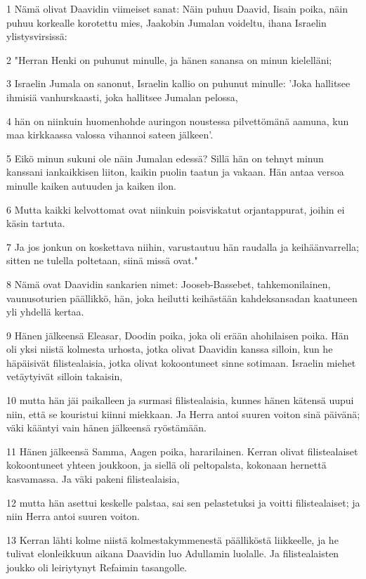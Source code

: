 \par 1 Nämä olivat Daavidin viimeiset sanat: Näin puhuu Daavid, Iisain poika, näin puhuu korkealle korotettu mies, Jaakobin Jumalan voideltu, ihana Israelin ylistysvirsissä:
\par 2 "Herran Henki on puhunut minulle, ja hänen sanansa on minun kielelläni;
\par 3 Israelin Jumala on sanonut, Israelin kallio on puhunut minulle: 'Joka hallitsee ihmisiä vanhurskaasti, joka hallitsee Jumalan pelossa,
\par 4 hän on niinkuin huomenhohde auringon noustessa pilvettömänä aamuna, kun maa kirkkaassa valossa vihannoi sateen jälkeen'.
\par 5 Eikö minun sukuni ole näin Jumalan edessä? Sillä hän on tehnyt minun kanssani iankaikkisen liiton, kaikin puolin taatun ja vakaan. Hän antaa versoa minulle kaiken autuuden ja kaiken ilon.
\par 6 Mutta kaikki kelvottomat ovat niinkuin poisviskatut orjantappurat, joihin ei käsin tartuta.
\par 7 Ja jos jonkun on koskettava niihin, varustautuu hän raudalla ja keihäänvarrella; sitten ne tulella poltetaan, siinä missä ovat."
\par 8 Nämä ovat Daavidin sankarien nimet: Jooseb-Bassebet, tahkemonilainen, vaunusoturien päällikkö, hän, joka heilutti keihästään kahdeksansadan kaatuneen yli yhdellä kertaa.
\par 9 Hänen jälkeensä Eleasar, Doodin poika, joka oli erään ahohilaisen poika. Hän oli yksi niistä kolmesta urhosta, jotka olivat Daavidin kanssa silloin, kun he häpäisivät filistealaisia, jotka olivat kokoontuneet sinne sotimaan. Israelin miehet vetäytyivät silloin takaisin,
\par 10 mutta hän jäi paikalleen ja surmasi filistealaisia, kunnes hänen kätensä uupui niin, että se kouristui kiinni miekkaan. Ja Herra antoi suuren voiton sinä päivänä; väki kääntyi vain hänen jälkeensä ryöstämään.
\par 11 Hänen jälkeensä Samma, Aagen poika, hararilainen. Kerran olivat filistealaiset kokoontuneet yhteen joukkoon, ja siellä oli peltopalsta, kokonaan hernettä kasvamassa. Ja väki pakeni filistealaisia,
\par 12 mutta hän asettui keskelle palstaa, sai sen pelastetuksi ja voitti filistealaiset; ja niin Herra antoi suuren voiton.
\par 13 Kerran lähti kolme niistä kolmestakymmenestä päälliköstä liikkeelle, ja he tulivat elonleikkuun aikana Daavidin luo Adullamin luolalle. Ja filistealaisten joukko oli leiriytynyt Refaimin tasangolle.

